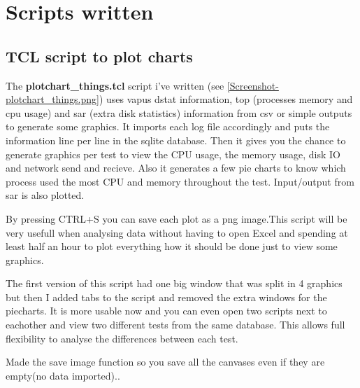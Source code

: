 \section{Scripts written}\label{sec:scripts}
\subsection{TCL script to plot charts}
The \textbf{plotchart\_things.tcl} script i've written (see \autoref{Screenshot-plotchart_things.png}) uses \gls{vapus} dstat information, 
top (processes memory and cpu usage) and sar (extra disk statistics) information from csv or simple outputs to generate some graphics.
It imports each log file accordingly and puts the information line per line in the \gls{sqlite} database.
Then it gives you the chance to generate graphics per test to view the CPU usage, the memory usage, disk IO and network send and recieve.
Also it generates a few pie charts to know which process used the most CPU and memory throughout the test. Input/output from sar is also plotted.
 
By pressing CTRL+S you can save each plot as a png image.This script will be very usefull when analysing data without having to open Excel and 
spending at least half an hour to plot everything how it should be done just to view some graphics.

The first version of this script had one big window that was split in 4 graphics but then I added tabs to the script and removed the extra windows for the piecharts.
It is more usable now and you can even open two scripts next to eachother and view two different tests from the same database. This allows full flexibility to analyse the differences between each test.

Made the save image function so you save all the canvases even if they are empty(no data imported)..

